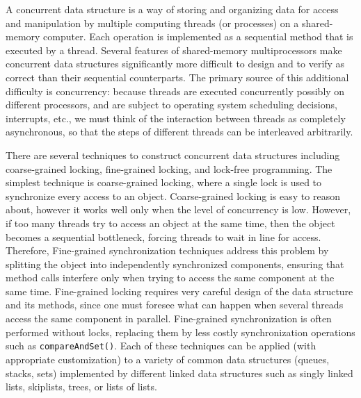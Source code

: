 A concurrent data structure is a way of storing and organizing data for access and manipulation by multiple computing threads (or processes) on a shared-memory computer. Each operation is implemented as a sequential
method that is executed by a thread. Several features of shared-memory multiprocessors make concurrent data structures significantly more difficult to design and to verify as correct than their sequential counterparts. The primary source of this additional difficulty is concurrency: because threads are executed concurrently possibly on different processors, and are subject to operating system scheduling decisions, interrupts, etc., we must think of the interaction between threads as completely asynchronous, so that the steps of different threads can be interleaved arbitrarily. %



There are several techniques to construct concurrent data structures including coarse-grained locking, fine-grained locking, and lock-free programming. The simplest technique is coarse-grained locking, where a single lock is used to synchronize every access to an object. Coarse-grained locking is easy to reason about, however it works well only when the level of concurrency is low. However, if too many threads try to access an object at the same time, then the object becomes a sequential bottleneck, forcing threads to wait in line for access. Therefore, Fine-grained synchronization techniques address this problem by splitting the object into independently synchronized components, ensuring that method calls interfere only when trying to access the same component at the same time. Fine-grained locking requires very careful design of the data structure and its
methods, since one must foresee what can happen when several threads access
the same component in parallel.
Fine-grained synchronization is often performed without locks, replacing them by less costly
synchronization operations such as {\tt compareAndSet()}. Each of these techniques can be applied (with appropriate customization) to a variety of common data structures (queues, stacks, sets) implemented by different linked data structures such as singly linked lists, skiplists, trees, or lists of lists. 




